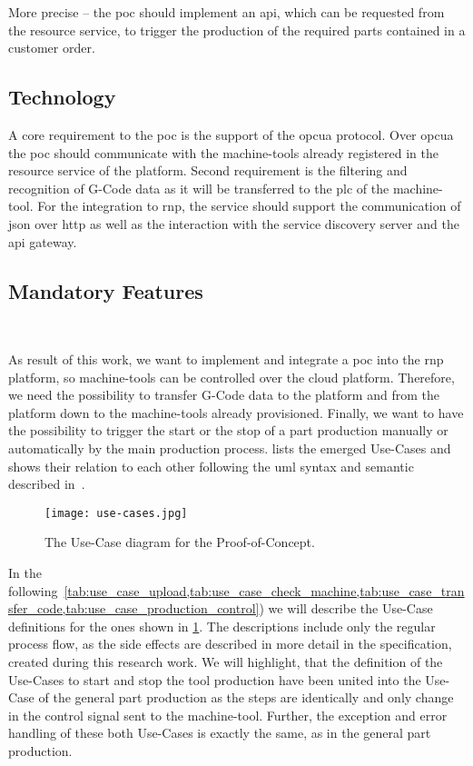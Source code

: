 \documentclass[
a4paper,
twoside,
headsepline,
cleardoublepage=empty,
parskip=half,
draft=false
]{scrbook}
\begin{document}
				More precise -- the \gls{poc} should implement an \gls{api}, which can be requested from the resource service, to trigger the production of the required parts contained in a customer order.

			\subsection{Technology} \label{subsec:technology}

				A core requirement to the \gls{poc} is the support of the \gls{opcua} protocol.
				Over \gls{opcua} the \gls{poc} should communicate with the machine-tools already registered in the resource service of the platform.
				Second requirement is the filtering and recognition of G-Code data as it will be transferred to the \gls{plc} of the machine-tool.
				For the integration to \gls{rnp}, the service should support the communication of \gls{json} over \gls{http} as well as the interaction with the service discovery server and the \gls{api} gateway.

			\subsection{Mandatory Features} \label{subsec:mandatory}

				As result of this work, we want to implement and integrate a \gls{poc} into the \gls{rnp} platform, so machine-tools can be controlled over the cloud platform.
				Therefore, we need the possibility to transfer G-Code data to the platform and from the platform down to the machine-tools already provisioned.
				Finally, we want to have the possibility to trigger the start or the stop of a part production manually or automatically by the main production process.  lists the emerged Use-Cases and shows their relation to each other following the \gls{uml} syntax and semantic described in~\cite{uml2017}.

				\begin{figure}[htbp]
					\centering
					\texttt{[image: use-cases.jpg]}
					\caption{The Use-Case diagram for the Proof-of-Concept.}
					\label{fig:use_cases}
				\end{figure}

				In the following~\cref{tab:use_case_upload,tab:use_case_check_machine,tab:use_case_transfer_code,tab:use_case_production_control}) we will describe the Use-Case definitions for the ones shown in \cref{fig:use_cases}. The descriptions include only the regular process flow, as the side effects are described in more detail in the specification, created during this research work. We will highlight, that the definition of the Use-Cases to start and stop the tool production have been united into the Use-Case of the general part production as the steps are identically and only change in the control signal sent to the machine-tool. Further, the exception and error handling of these both Use-Cases is exactly the same, as in the general part production.
				
\end{document}
